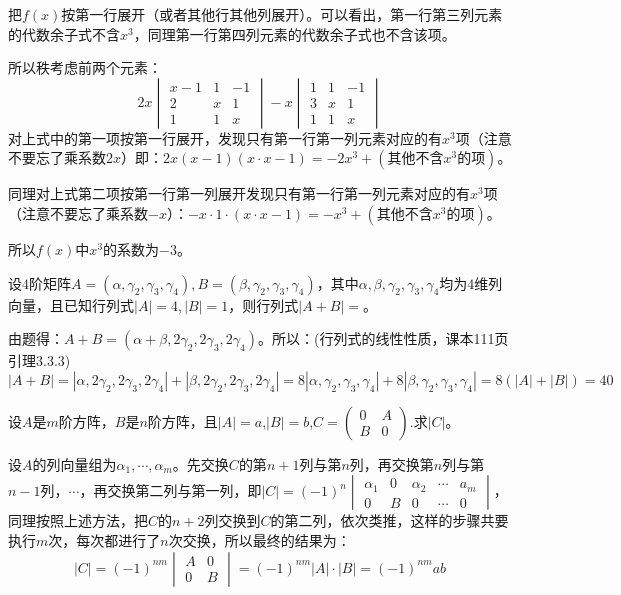 \documentclass[a4paper]{report}
\begin{document}
\begin{jie}
把$f(x)$按第一行展开（或者其他行其他列展开）。可以看出，第一行第三列元素的代数余子式不含$x^3$，同理第一行第四列元素的代数余子式也不含该项。

所以秩考虑前两个元素：
\begin{equation*}
2x\begin{vmatrix}
x-1&1&-1\\
2&x&1\\
1&1&x
\end{vmatrix}-x\begin{vmatrix}
1&1&-1\\
3&x&1\\
1&1&x
\end{vmatrix}
\end{equation*}
对上式中的第一项按第一行展开，发现只有第一行第一列元素对应的有$x^3$项（注意不要忘了乘系数$2x$）即：$2x(x-1)(x\cdot x-1)=-2x^{3}+(\text{其他不含$x^3$的项})$。

同理对上式第二项按第一行第一列展开发现只有第一行第一列元素对应的有$x^3$项（注意不要忘了乘系数$-x$）：$-x\cdot 1\cdot(x\cdot x-1)=-x^3+(\text{其他不含$x^3$的项})$。

所以$f(x)$中$x^3$的系数为$-3$。
\end{jie}

\EX 设$4$阶矩阵$A=(\alpha,\gamma_2,\gamma_3,\gamma_4),B=(\beta,\gamma_2,\gamma_3,\gamma_4)$，其中$\alpha,\beta,\gamma_2,\gamma_3,\gamma_4$均为$4$维列向量，且已知行列式$|A|=4,|B|=1$，则行列式$|A+B|=$\underline{\hphantom{~~~~~~~~~~~~}}。

\begin{jie}
由题得：$A+B=(\alpha+\beta,2\gamma_2,2\gamma_3,2\gamma_4)$。所以：(行列式的线性性质，课本111页引理3.3.3)
\begin{equation*}
|A+B|=|\alpha,2\gamma_2,2\gamma_3,2\gamma_4|+|\beta,2\gamma_2,2\gamma_3,2\gamma_4|=8|\alpha,\gamma_2,\gamma_3,\gamma_4|+8|\beta,\gamma_2,\gamma_3,\gamma_4|=8(|A|+|B|)=40
\end{equation*}
\end{jie}

\EX 设$A$是$m$阶方阵，$B$是$n$阶方阵，且$|A|=a$,$|B|=b$,$
C=
\begin{pmatrix}
0&A\\
B&0
\end{pmatrix}
$.求$|C|$。

\begin{jie}
设$A$的列向量组为$\alpha_1,\cdots,\alpha_m$。先交换$C$的第$n+1$列与第$n$列，再交换第$n$列与第$n-1$列，$\cdots$，再交换第二列与第一列，即$|C|=
(-1)^n
\begin{vmatrix}
\alpha_1&0&\alpha_2&\cdots&a_m\\
0&B&0&\cdots&0
\end{vmatrix}
$，同理按照上述方法，把$C$的$n+2$列交换到$C$的第二列，依次类推，这样的步骤共要执行$m$次，每次都进行了$n$次交换，所以最终的结果为：
\begin{equation*}
  |C|=(-1)^{nm}
  \begin{vmatrix}
   A&0\\
   0&B
  \end{vmatrix}=(-1)^{nm}|A|\cdot|B|=(-1)^{nm}ab
\end{equation*}
\end{jie}
\end{document}
